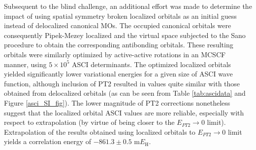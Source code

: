 \documentclass[journal=jcp,manuscript=suppinfo]{achemso}
\begin{document}
Subsequent to the blind challenge, an additional effort was made to determine the impact of using spatial symmetry broken localized orbitals as an initial guess instead of delocalized canonical MOs. The occupied canonical orbitals were consequently Pipek-Mezey localized\cite{pipek_mezey_jcp_1989} and the virtual space subjected to the Sano procedure\cite{sano2000elementary} to obtain the corresponding antibonding orbitals. These resulting orbitals were similarly optimized by active-active rotations in an MCSCF manner, using $5\times 10^5$ ASCI determinants\cite{levine2020casscf}. The optimized localized orbitals yielded significantly lower variational energies for a given size of ASCI wave function, although inclusion of PT2 resulted in values quite similar with those obtained from delocalized orbitals (as can be seen from Table \ref{tab:ascidata} and  Figure \ref{asci_SI_fig}). The lower magnitude of PT2 corrections nonetheless suggest that the localized orbital ASCI values are more reliable, especially with respect to extrapolation (by virtue of being closer to the $E_{PT2}\to 0$ limit). Extrapolation of the results obtained using localized orbitals to $E_{PT2}\to 0$ limit yields a correlation energy of $-861.3\pm0.5$ m$E_{\text{H}}$.\\
\end{document}
